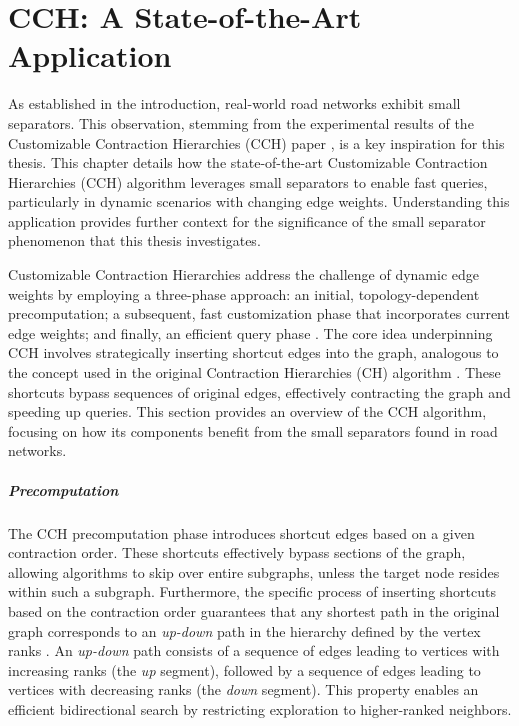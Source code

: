 \chapter{CCH: A State-of-the-Art Application}
\label{ch:cch}

As established in the introduction, real-world road networks exhibit small separators.
This observation, stemming from the experimental results of the Customizable Contraction Hierarchies (CCH) paper \cite{dibbelt_customizable_2016}, is a key inspiration for this thesis.
This chapter details how the state-of-the-art Customizable Contraction Hierarchies (CCH) algorithm leverages small separators to enable fast queries, particularly in dynamic scenarios with changing edge weights.
Understanding this application provides further context for the significance of the small separator phenomenon that this thesis investigates.

Customizable Contraction Hierarchies address the challenge of dynamic edge weights by employing a three-phase approach: an initial, topology-dependent precomputation; a subsequent, fast customization phase that incorporates current edge weights; and finally, an efficient query phase \cite{delling_customizable_2011, dibbelt_customizable_2016}.
The core idea underpinning CCH involves strategically inserting shortcut edges into the graph, analogous to the concept used in the original Contraction Hierarchies (CH) algorithm \cite{geisberger_contraction_2008}.
These shortcuts bypass sequences of original edges, effectively contracting the graph and speeding up queries.
This section provides an overview of the CCH algorithm, focusing on how its components benefit from the small separators found in road networks.

\paragraph{Precomputation}

The CCH precomputation phase introduces shortcut edges based on a given contraction order.
These shortcuts effectively bypass sections of the graph, allowing algorithms to skip over entire subgraphs, unless the target node resides within such a subgraph.
Furthermore, the specific process of inserting shortcuts based on the contraction order guarantees that any shortest path in the original graph corresponds to an \emph{up-down} path in the hierarchy defined by the vertex ranks \cite{geisberger_contraction_2008}.
An \emph{up-down} path consists of a sequence of edges leading to vertices with increasing ranks (the \emph{up} segment), followed by a sequence of edges leading to vertices with decreasing ranks (the \emph{down} segment).
This property enables an efficient bidirectional search by restricting exploration to higher-ranked neighbors.

